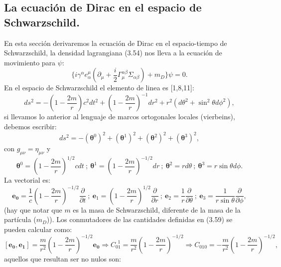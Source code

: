 \subsection{La ecuación de Dirac en el espacio de Schwarzschild.}
En esta sección derivaremos la ecuación de Dirac en el espacio-tiempo de Schwarzschild, la densidad lagrangiana (3.54) nos lleva a la ecuación de movimiento para $\psi$:
\begin{equation}
\{i\gamma^{\alpha}e_{\alpha}^{\mu}(\partial_{\mu}+\frac{i}{2}\Gamma_{\mu}^{\alpha\beta}\Sigma_{\alpha\beta})+m_{D}\}\psi=0 .
\end{equation}
En el espacio de Schwarzschild el elemento de linea es [1,8,11]:
\begin{equation}
ds^{2}=-\left(1-\frac{2m}{r}\right)c^{2}dt^{2}+\left(1-\frac{2m}{r}\right)^{-1}dr^{2}+r^{2}(d\theta^{2}+\sin^{2}\theta d\phi^{2}),
\end{equation}
si llevamos lo anterior al lenguaje de marcos ortogonales locales (vierbeins), debemos escribir:
\begin{equation}
ds^{2}=-(\mathbf{\theta}^{0})^{2}+(\mathbf{\theta}^{1})^{2}+(\mathbf{\theta}^{2})^{2}+(\mathbf{\theta}^{3})^{2} ,
\end{equation}
con $g_{\mu\nu}=\eta_{\mu\nu}$ y
\begin{equation}
\mathbf{\theta}^{0}=\left(1-\frac{2m}{r}\right)^{1/2}cdt\ ;\ \mathbf{\theta}^{1}=\left(1-\frac{2m}{r}\right)^{-1/2}dr\ ;\ \mathbf{\theta}^{2}=rd\theta\ ;\ \mathbf{\theta}^{3}=r\sin\theta d\phi .
\end{equation}
La vectorial es:
\begin{equation}
\mathbf{e_{0}}=\frac{1}{c}\left(1-\frac{2m}{r}\right)^{-1/2}\frac{\partial}{\partial t}\ ;\ \mathbf{e}_{1}=\left(1-\frac{2m}{r}\right)^{1/2}\frac{\partial}{\partial r}\ ;\ \mathbf{e}_{2}=\frac{1}{r}\frac{\partial}{\partial\theta}\ ;\ \mathbf{e}_{3}=\frac{1}{r\sin\theta}\frac{\partial}{\partial\phi} ,
\end{equation}
(hay que notar que $m$ es la masa de Schwarzschild, diferente de la masa de la partícula ($m_D$)). Los conmutadores de las cantidades definidas en (3.59) se pueden calcular como:
\begin{equation}
\nonumber [\mathbf{e_{0}},\mathbf{e_{1}}]=\frac{m}{r^{2}}\left(1-\frac{2m}{r}\right)^{-1/2}\mathbf{e_{0}}\Rightarrow C_{01}^{\ \ 1}=\frac{m}{r^{2}}\left(1-\frac{2m}{r}\right)^{-1/2}\Rightarrow C_{010}=-\frac{m}{r^{2}}\left(1-\frac{2m}{r}\right)^{-1/2} ,
\end{equation}
aquellos que resultan ser no nulos son:
